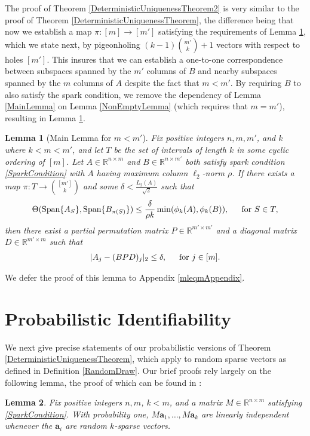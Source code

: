 \documentclass[journal, twocolumn]{IEEEtran}
\newtheorem{lemma}{Lemma}
\begin{document}
The proof of Theorem \ref{DeterministicUniquenessTheorem2} is very similar to the proof of Theorem \ref{DeterministicUniquenessTheorem}, the difference being that now we establish a map $\pi: [m] \to [m']$ satisfying the requirements of Lemma \ref{MainLemma2}, which we state next, by pigeonholing $(k-1){m' \choose k} + 1$ vectors with respect to holes $[m']$. This insures that we can establish a one-to-one correspondence between subspaces spanned by the $m'$ columns of $B$ and nearby subspaces spanned by the $m$ columns of $A$ despite the fact that $m < m'$. By requiring $B$ to also satisfy the spark condition, we remove the dependency of Lemma \ref{MainLemma} on Lemma \ref{NonEmptyLemma} (which requires that $m = m'$), resulting in Lemma \ref{MainLemma2}.

\begin{lemma}[Main Lemma for $m < m'$]\label{MainLemma2}
Fix positive integers $n, m, m'$, and $k$ where $k < m < m'$, and let $T$ be the set of intervals of length $k$ in some cyclic ordering of $[m]$. Let $A \in \mathbb{R}^{n \times m}$ and $B \in \mathbb{R}^{n \times m'}$ both satisfy spark condition \eqref{SparkCondition} with $A$ having maximum column $\ell_2$-norm $\rho$. If there exists a map $\pi: T \to {[m'] \choose k}$ and some $\delta < \frac{L_{2}(A)}{\sqrt{2}}$ such that 
\begin{equation}\label{GapUpperBound2}
\Theta(\text{\rm Span}\{A_{S}\}, \text{\rm Span}\{B_{\pi(S)}\}) \leq \frac{ \delta }{\rho k} \min(\phi_k(A), \phi_k(B)), \indent \text{for } S \in T,
\end{equation}
%
then there exist a partial permutation matrix $P \in \mathbb{R}^{m' \times m'}$ and a diagonal matrix $D \in \mathbb{R}^{m' \times m}$ such that
\begin{align}
|A_j - (BPD)_j|_2 \leq \delta, \indent \text{for } j \in [m].
\end{align}
\end{lemma}

We defer the proof of this lemma to Appendix \ref{mleqmAppendix}.


\section{Probabilistic Identifiability}\label{PUT}

We next give precise statements of our probabilistic versions of Theorem \ref{DeterministicUniquenessTheorem}, which apply to random sparse vectors as defined in Definition \ref{RandomDraw}. Our brief proofs rely largely on the following lemma, the proof of which can be found in \cite[Lemma 3]{Hillar15}:
\begin{lemma}\label{Hillar15lemma2}
Fix positive integers $n, m$, $k < m$, and a matrix $M \in \mathbb{R}^{n \times m}$ satisfying \eqref{SparkCondition}. With probability one, $M\mathbf{a}_1, \ldots, M\mathbf{a}_k$ are linearly independent whenever the $\mathbf{a}_i$ are random $k$-sparse vectors.
\end{lemma}
\end{document}
